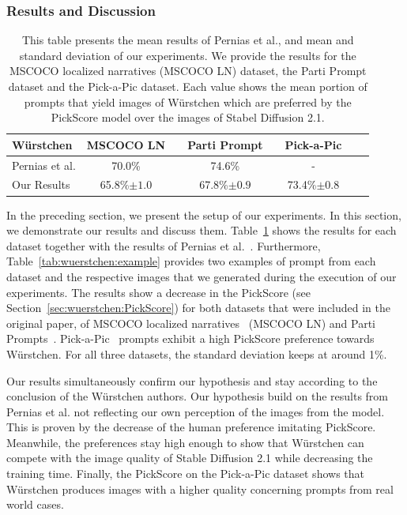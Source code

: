 \subsubsection{Results and Discussion}
\begin{table}[t]
    \caption{This table presents the mean results of Pernias et
        al.\cite{pernias2024wrstchen}, and mean and standard deviation of our
        experiments. We provide the results for the MSCOCO localized narratives
        (MSCOCO LN) dataset, the Parti Prompt dataset and the Pick-a-Pic
        dataset. Each value shows the mean portion of prompts that yield images
        of W\"urstchen which are preferred by the PickScore model over the
        images of Stabel Diffusion 2.1.}
    \label{tab:wuerstchen:results}
    \centering
    \begin{tabular}{lccccccc}
        \toprule
        \textbf{W\"urstchen}                     & \textbf{MSCOCO LN}    & \phantom{0} & \textbf{Parti Prompt} & \phantom{0} & \textbf{Pick-a-Pic}   \\
        \midrule
        Pernias et al.\cite{pernias2024wrstchen} & 70.0\%                & \phantom{0} & 74.6\%                & \phantom{0} & -                     \\
        Our Results                              & 65.8\%{\tiny$\pm1.0$} & \phantom{0} & 67.8\%{\tiny$\pm0.9$} & \phantom{0} & 73.4\%{\tiny$\pm0.8$} \\
        \bottomrule
    \end{tabular}
\end{table}
In the preceding section, we present the setup of our experiments. In this
section, we demonstrate our results and discuss them.
Table~\ref{tab:wuerstchen:results} shows the results for each dataset together
with the results of Pernias et al.~\cite{pernias2024wrstchen}. Furthermore,
Table~\ref{tab:wuerstchen:example} provides two examples of prompt from each
dataset and the respective images that we generated during the execution of our
experiments. The results show a decrease in the PickScore (see
Section~\ref{sec:wuerstchen:PickScore}) for both datasets that were included in
the original paper, of MSCOCO localized
narratives~\cite{PontTuset2020LocalizedNarratives} (MSCOCO LN) and Parti
Prompts~\cite{yu2022scalingautoregressivemodelscontentrich}.
Pick-a-Pic~\cite{kirstain2023pickapic} prompts exhibit a high PickScore
preference towards W\"urstchen. For all three datasets, the standard deviation
keeps at around 1\%.

Our results simultaneously confirm our hypothesis and stay according to the
conclusion of the W\"urstchen authors. Our hypothesis build on the results
from Pernias et al. not reflecting our own perception of the images from the
model. This is proven by the decrease of the human preference imitating
PickScore. Meanwhile, the preferences stay high enough to show that W\"urstchen can
compete with the image quality of Stable Diffusion 2.1 while decreasing the
training time. Finally, the PickScore on the Pick-a-Pic dataset shows that
W\"urstchen produces images with a higher quality concerning prompts from
real world cases.

